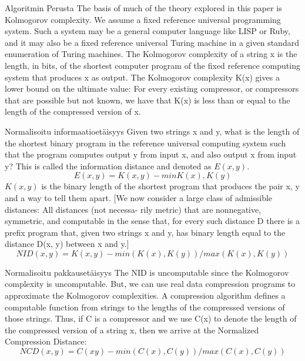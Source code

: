 \documentclass{beamer}
\begin{document}
\begin{frame}{Algoritmin Perusta}
  The basis of much of the theory explored in this paper is Kolmogorov complexity.
    We assume a fixed reference universal programming system. Such a system may be a general computer language like LISP or Ruby, and it may also be a fixed reference universal Turing machine in a given standard enumeration of Turing machines.
    The Kolmogorov complexity of a string x is the length, in bits, of the shortest computer program of the fixed reference computing system that produces x as output. The Kolmogorov complexity K(x) gives a lower bound on the ultimate value: For every existing compressor, or compressors that are possible but not known, we have that K(x) is less than or equal to the length of the compressed version of x.
\end{frame}

\begin{frame}{Normalisoitu informaatioetäisyys}
  Given two strings x and y, what is the length of the shortest binary program in the reference universal computing system such that the program computes output y from input x, and also output x from input y? This is called the information distance and denoted as $E(x,y).$
  \[
    E(x, y) = K(x, y) - min{K(x), K(y)}
  \]
    $K(x,y)$ is the binary length of the shortest program that produces the pair x, y and a way to tell them apart.
    [We now consider a large class of admissible distances: All distances (not necessa- rily metric) that are nonnegative, symmetric, and computable in the sense that, for every such distance D there is a prefix program that, given two strings x and y, has binary length equal to the distance D(x, y) between x and y.]
    \[
      NID(x,y) =  K(x, y) - min(K(x), K(y)) / max(K(x), K(y))
    \]
\end{frame}

\begin{frame}{Normalisoitu pakkausetäisyys}
  The NID is uncomputable since the Kolmogorov complexity is uncomputable. But, we can use real data compression programs to approximate the Kolmogorov complexities. A compression algorithm defines a computable function from strings to the lengths of the compressed versions of those strings.
    Thus, if C is a compressor and we use C(x) to denote the length of the compressed version of a string x, then we arrive at the Normalized Compression Distance:
    \[
    NCD(x,y) =  C(xy) - min(C(x), C(y)) / max(C(x), C(y))
    \]
\end{frame}
\end{document}
